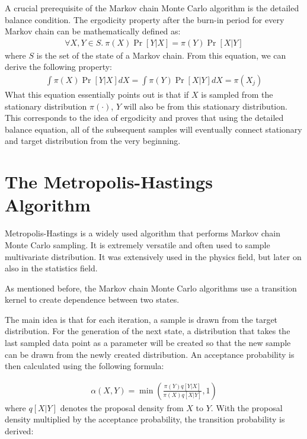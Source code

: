A crucial prerequisite of the Markov chain Monte Carlo algorithm is the detailed balance condition. The ergodicity property after the burn-in period for every Markov chain can be mathematically defined as:
\begin{align}
\forall X, Y\in S. \ \pi(X) \Pr[Y|X] = \pi(Y) \Pr[X|Y]
\end{align}
\cite{mcmc_practice} where $S$ is the set of the state of a Markov chain. From this equation, we can derive the following property:
\begin{align}
\int \pi(X) \Pr[Y|X] dX= \int \pi(Y) \Pr[X|Y] dX =\pi(X_j)
\end{align}
What this equation essentially points out is that if $X$ is sampled from the stationary distribution $\pi(\cdot)$, $Y$ will also be from this stationary distribution.\cite{mcmc_practice} This corresponds to the idea of ergodicity and proves that using the detailed balance equation, all of the subsequent samples will eventually connect stationary and target distribution from the very beginning.

\section{The Metropolis-Hastings Algorithm}
Metropolis-Hastings is a widely used algorithm that performs Markov chain Monte Carlo sampling. It is extremely versatile and often used to sample multivariate distribution. It was extensively used in the physics field, but later on also in the statistics field.\cite{understanding_mh}

As mentioned before, the Markov chain Monte Carlo algorithms use a transition kernel to create dependence between two states.

The main idea is that for each iteration, a sample is drawn from the target distribution. For the generation of the next state, a distribution that takes the last sampled data point as a parameter will be created so that the new sample can be drawn from the newly created distribution.\cite{mcmc_practice} An acceptance probability is then calculated using the following formula:

\begin{align}
\alpha(X, Y) = \min (\frac{\pi(Y)q[Y|X]}{\pi(X)q[X|Y]}, 1)
\end{align}
where $q[X|Y]$ denotes the proposal density from $X$ to $Y$. With the proposal density multiplied by the acceptance probability, the transition probability is derived:


